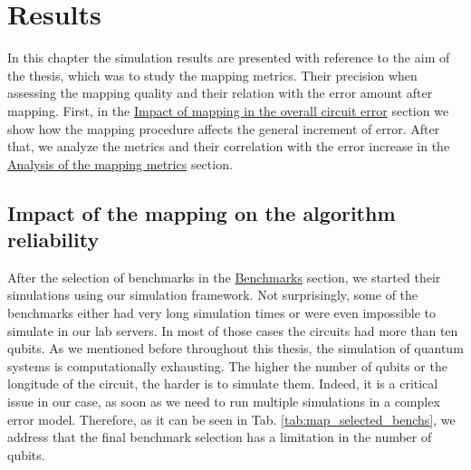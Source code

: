 
\chapter{Results}
\label{sec:org77ad494}

In this chapter the simulation results are presented with reference to the aim of the thesis, which was to study the mapping metrics.
Their precision when assessing the mapping quality and their relation with the error amount after mapping.
First, in the \hyperref[sec:org8e2b7f5]{Impact of mapping in the overall circuit error} section we show how the mapping procedure affects the general increment of error.
After that, we analyze the metrics and their correlation with the error increase in the \hyperref[sec:orgfee112c]{Analysis of the mapping metrics} section.

\section{Impact of the mapping on the algorithm reliability}
\label{sec:org8e2b7f5}
After the selection of benchmarks in the \href{chapter-4.org}{Benchmarks} section, we started their simulations using our simulation framework.
Not surprisingly, some of the benchmarks either had very long simulation times or were even impossible to simulate in our lab servers. In most of those cases the circuits had more than ten qubits.
As we mentioned before throughout this thesis, the simulation of quantum systems is computationally exhausting.
The higher the number of qubits or the longitude of the circuit, the harder is to simulate them.
Indeed, it is a critical issue in our case, as soon as we need to run multiple simulations in a complex error model.
Therefore, as it can be seen in Tab. \ref{tab:map_selected_benchs}, we address that the final benchmark selection has a limitation in the number of qubits.


